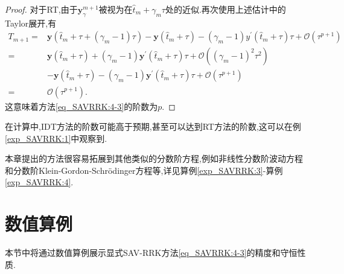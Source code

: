 \begin{proof}
对于RT,由于$\bm{y}_\gamma^{m+1}$被视为在$\hat{t}_m+\gamma_m \tau$处的近似.再次使用上述估计中的Taylor展开,有
\begin{align}
T_{m+1}\!= & \bm{y}\left(\hat{t}_m\!+\!\tau\!+\!\left(\gamma_m\!-\!1\right) \tau\right)\!-\!\bm{y}\left(\hat{t}_m\!+\!\tau\right)\!-\!\left(\gamma_m\!-\!1\right) y^{\prime}\left(\hat{t}_m\!+\!\tau\right) \tau\!+\!\mathcal{O}(\tau^{p+1}) \nonumber\\
\!= & \bm{y}\left(\hat{t}_m\!+\!\tau\right)\!+\!\left(\gamma_m\!-\!1\right) \bm{y}^{\prime}\left(\hat{t}_m\!+\!\tau\right) \tau\!+\!\mathcal{O}(\left(\gamma_m\!-\!1\right)^2 \tau^2)\!\nonumber\\
&-\!\bm{y}\left(\hat{t}_m\!+\!\tau\right)\!-\!\left(\gamma_m\!-\!1\right) \bm{y}^{\prime}\left(\hat{t}_m\!+\!\tau\right) \tau\!+\!\mathcal{O}(\tau^{p+1}) \nonumber\\
\!= & \mathcal{O}(\tau^{p+1}).
\end{align}
这意味着方法\eqref{eq_SAVRRK:4-3}的阶数为$p$.
\end{proof}

\begin{remark}\label{rk_SAVRRK:5_5}
在计算中,IDT方法的阶数可能高于预期,甚至可以达到RT方法的阶数,这可以在例\ref{exp_SAVRRK:1}中观察到.
\end{remark}
	
\begin{remark}\label{rk_SAVRRK:5_6}
本章提出的方法很容易拓展到其他类似的分数阶方程,例如非线性分数阶波动方程和分数阶Klein-Gordon-Schr{\"o}dinger方程等,详见算例\ref{exp_SAVRRK:3}-算例\ref{exp_SAVRRK:4}.
\end{remark}

\section{数值算例}\label{Section_SAVRRK: 6}

本节中将通过数值算例展示显式SAV-RRK方法\eqref{eq_SAVRRK:4-3}的精度和守恒性质.

